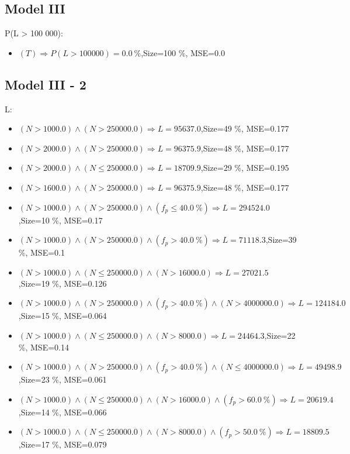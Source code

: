 \documentclass[numbered]{CSL}
\begin{document}
\subsection{Model III}
P(L > 100 000):
\begin{itemize}
\item $(T) \Rightarrow P(L > 100 000) = 0.0~\%$,\hfill Size=100 \%, MSE=0.0
\end{itemize}

\subsection{Model III - 2}
L:
\begin{itemize}
\item $(N > 1000.0) \land (N > 250000.0) \Rightarrow L = 95637.0$,\hfill Size=49 \%, MSE=0.177
\item $(N > 2000.0) \land (N > 250000.0) \Rightarrow L = 96375.9$,\hfill Size=48 \%, MSE=0.177
\item $(N > 2000.0) \land (N \leq 250000.0) \Rightarrow L = 18709.9$,\hfill Size=29 \%, MSE=0.195
\item $(N > 1600.0) \land (N > 250000.0) \Rightarrow L = 96375.9$,\hfill Size=48 \%, MSE=0.177
\item $(N > 1000.0) \land (N > 250000.0) \land (f_p \leq 40.0~\%) \Rightarrow L = 294524.0$,\hfill Size=10 \%, MSE=0.17
\item $(N > 1000.0) \land (N > 250000.0) \land (f_p > 40.0~\%) \Rightarrow L = 71118.3$,\hfill Size=39 \%, MSE=0.1
\item $(N > 1000.0) \land (N \leq 250000.0) \land (N > 16000.0) \Rightarrow L = 27021.5$,\hfill Size=19 \%, MSE=0.126
\item $(N > 1000.0) \land (N > 250000.0) \land (f_p > 40.0~\%) \land (N > 4000000.0) \Rightarrow L = 124184.0$,\hfill Size=15 \%, MSE=0.064
\item $(N > 1000.0) \land (N \leq 250000.0) \land (N > 8000.0) \Rightarrow L = 24464.3$,\hfill Size=22 \%, MSE=0.14
\item $(N > 1000.0) \land (N > 250000.0) \land (f_p > 40.0~\%) \land (N \leq 4000000.0) \Rightarrow L = 49498.9$,\hfill Size=23 \%, MSE=0.061
\item $(N > 1000.0) \land (N \leq 250000.0) \land (N > 16000.0) \land (f_p > 60.0~\%) \Rightarrow L = 20619.4$,\hfill Size=14 \%, MSE=0.066
\item $(N > 1000.0) \land (N \leq 250000.0) \land (N > 8000.0) \land (f_p > 50.0~\%) \Rightarrow L = 18809.5$,\hfill Size=17 \%, MSE=0.079

\end{itemize}
\end{document}
